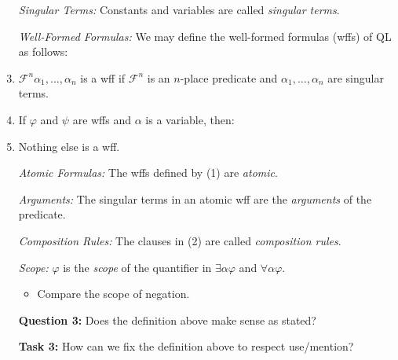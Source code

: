 \documentclass[a4paper, 11pt]{article} %
\begin{document}
\begin{enumerate}
  \item[\it Singular Terms:] Constants and variables are called \textit{singular terms}.
  \item[\it Well-Formed Formulas:] We may define the well-formed formulas (wffs) of QL as follows:
  \item $\mathcal{F}^n\alpha_1,\ldots,\alpha_n$ is a wff if $\mathcal{F}^n$ is an $n$-place predicate and $\alpha_1,\ldots,\alpha_n$ are singular terms.
  \item If $\varphi$ and $\psi$ are wffs and $\alpha$ is a variable, then:
    \begin{enumerate}
    \end{enumerate}
  \item Nothing else is a wff.
  \item[\it Atomic Formulas:] The wffs defined by (1) are \textit{atomic}.
  \item[\it Arguments:] The singular terms in an atomic wff are the \textit{arguments} of the predicate.
  \item[\it Composition Rules:] The clauses in (2) are called \textit{composition rules}.
  \item[\it Scope:] $\varphi$ is the \textit{scope} of the quantifier in $\exists \alpha \varphi$ and $\forall \alpha \varphi$.
    \begin{itemize}
      \item Compare the scope of negation.
    \end{itemize}
  \item[\bf Question 3:] Does the definition above make sense as stated?
  \item[\bf Task 3:] How can we fix the definition above to respect use/mention?
\end{enumerate}
\end{document}
